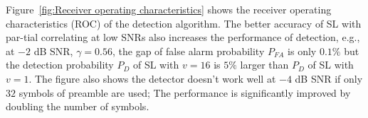 Figure~\ref{fig:Receiver operating characteristics} shows the receiver operating characteristics (ROC) of the detection algorithm.
The better accuracy of SL with par-tial correlating at low SNRs also increases the performance of detection, e.g.,
at $-2$ dB SNR, $\gamma=0.56$, the gap of false alarm probability $P_{FA}$ is only $0.1\%$ but the detection probability $P_{D}$ of SL with $v{=}16$ is $5\%$ larger than $P_D$ of SL with $v{=}1$. 
The figure also shows the detector doesn't work well at $-4$ dB SNR if only $32$ symbols of preamble are used;  
The performance is significantly improved by doubling the number of symbols.

